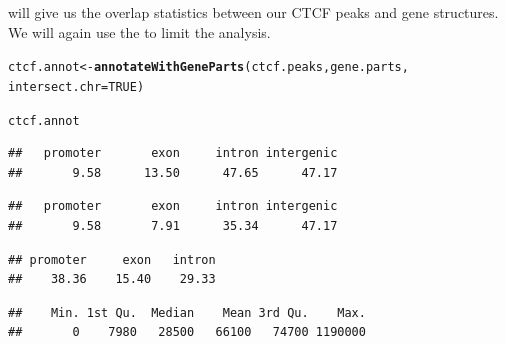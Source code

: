 \documentclass{article}\usepackage[]{graphicx}\usepackage[]{color}
\makeatletter
\newcommand{\hlnum}[1]{\textcolor[rgb]{0.686,0.059,0.569}{#1}}%
\newcommand{\hlstd}[1]{\textcolor[rgb]{0.345,0.345,0.345}{#1}}%
\newcommand{\hlkwb}[1]{\textcolor[rgb]{0.69,0.353,0.396}{#1}}%
\newcommand{\hlkwc}[1]{\textcolor[rgb]{0.333,0.667,0.333}{#1}}%
\newcommand{\hlkwd}[1]{\textcolor[rgb]{0.737,0.353,0.396}{\textbf{#1}}}%
\newenvironment{kframe}{%
 \def\at@end@of@kframe{}%
 \ifinner\ifhmode%
  \def\at@end@of@kframe{\end{minipage}}%
  \begin{minipage}{\columnwidth}%
 \fi\fi%
 \def\FrameCommand##1{\hskip\@totalleftmargin \hskip-\fboxsep
 \colorbox{shadecolor}{##1}\hskip-\fboxsep
     \hskip-\linewidth \hskip-\@totalleftmargin \hskip\columnwidth}%
 \MakeFramed {\advance\hsize-\width
   \@totalleftmargin\z@ \linewidth\hsize
   \@setminipage}}%
 {\par\unskip\endMakeFramed%
 \at@end@of@kframe}
\newenvironment{knitrout}{}{} %
\makeatother
\begin{document}
 will give us the  overlap statistics between our 
CTCF peaks and gene structures. We will again use the 
to limit the analysis.
\begin{knitrout}
\color{fgcolor}\begin{kframe}
\begin{alltt}
\hlstd{ctcf.annot} \hlkwb{<-} \hlkwd{annotateWithGeneParts}\hlstd{(ctcf.peaks, gene.parts,}
    \hlkwc{intersect.chr} \hlstd{=} \hlnum{TRUE}\hlstd{)}
\end{alltt}


{\ttfamily\noindent\itshape\color{messagecolor}{\#\# intersecting chromosomes...}}\begin{alltt}
\hlstd{ctcf.annot}
\end{alltt}


{\ttfamily\noindent\itshape\color{messagecolor}{\#\# Summary of target set annotation with genic parts\\\#\# Rows in target set: 1681\\\#\# -----------------------\\\#\# percentage of target features overlapping with annotation:}}\begin{verbatim}
##   promoter       exon     intron intergenic 
##       9.58      13.50      47.65      47.17
\end{verbatim}


{\ttfamily\noindent\itshape\color{messagecolor}{\#\# \\\#\# percentage of target features overlapping with annotation:\\\#\# (with promoter > exon > intron precedence):}}\begin{verbatim}
##   promoter       exon     intron intergenic 
##       9.58       7.91      35.34      47.17
\end{verbatim}


{\ttfamily\noindent\itshape\color{messagecolor}{\#\# \\\#\# percentage of annotation boundaries with feature overlap:}}\begin{verbatim}
## promoter     exon   intron 
##    38.36    15.40    29.33
\end{verbatim}


{\ttfamily\noindent\itshape\color{messagecolor}{\#\# \\\#\# summary of distances to the nearest TSS:}}\begin{verbatim}
##    Min. 1st Qu.  Median    Mean 3rd Qu.    Max. 
##       0    7980   28500   66100   74700 1190000
\end{verbatim}


{\ttfamily\noindent\itshape\color{messagecolor}{\#\# }}\end{kframe}
\end{knitrout}
\end{document}
